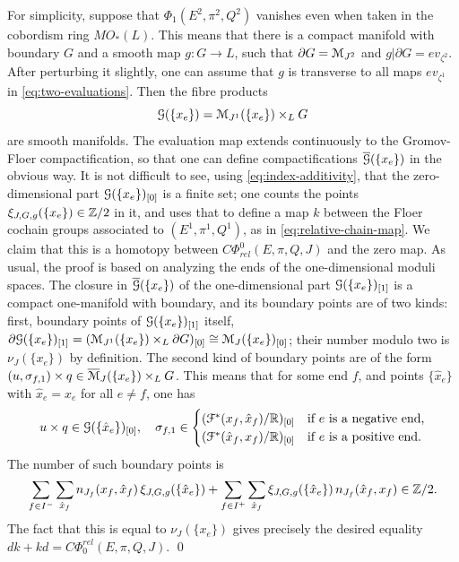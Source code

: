 \documentclass[10pt,letterpaper]{article}
\begin{document}
\proof For simplicity, suppose that $\Phi_1(E^2,\pi^2,Q^2)$ vanishes even when
taken in the cobordism ring $MO_*(L)$. This means that there is a compact
manifold with boundary $G$ and a smooth map $g: G \rightarrow L$, such that
$\partial G = \mathcal{M}_{J^2}$ and $g|\partial G = ev_{\zeta^2}$. After perturbing it
slightly, one can assume that $g$ is transverse to all maps $ev_{\zeta^1}$ in
\eqref{eq:two-evaluations}. Then the fibre products
\begin{equation} \label{eq:fibre-product}
\mathcal{G}(\{x_e\}) = \mathcal{M}_{J^1}(\{x_e\}) \times_L G
\end{equation}
are smooth manifolds. The evaluation map extends continuously to the
Gromov-Floer compactification, so that one can define compactifications
$\overline{\mathcal{G}}(\{x_e\})$ in the obvious way. It is not difficult to see, using
\eqref{eq:index-additivity}, that the zero-dimensional part
$\mathcal{G}(\{x_e\})_{[0]}$ is a finite set; one counts the points
$\xi_{J,G,g}(\{x_e\}) \in \mathbb{Z}/2$ in it, and uses that to define a map $k$
between the Floer cochain groups associated to $(E^1,\pi^1,Q^1)$, as in
\eqref{eq:relative-chain-map}. We claim that this is a homotopy between
$C\Phi^0_{rel}(E,\pi,Q,J)$ and the zero map. As usual, the proof is based on
analyzing the ends of the one-dimensional moduli spaces. The closure in
$\overline{\mathcal{G}}(\{x_e\})$ of the one-dimensional part $\mathcal{G}(\{x_e\})_{[1]}$ is a
compact one-manifold with boundary, and its boundary points are of two kinds:
first, boundary points of $\mathcal{G}(\{x_e\})_{[1]}$ itself,
$\partial\mathcal{G}(\{x_e\})_{[1]} = (\mathcal{M}_{J^1}(\{x_e\}) \times_L \partial G)_{[0]}
\cong \mathcal{M}_J(\{x_e\})_{[0]}$; their number modulo two is $\nu_J(\{x_e\})$ by
definition. The second kind of boundary points are of the form
$(u,\sigma_{f,1}) \times q \in \overline{\mathcal{M}}_J(\{x_e\}) \times_L G$. This
means that for some end $f$, and points $\{\hat{x}_e\}$ with $\hat{x}_e = x_e$
for all $e \neq f$, one has
\[
 u \times q \in \mathcal{G}(\{\hat{x}_e\})_{[0]}, \quad
 \sigma_{f,1} \in \begin{cases}
 (\mathcal{F}^*(x_f,\hat{x}_f)/\mathbb{R})_{[0]} & \text{if $e$ is a negative end,} \\
 (\mathcal{F}^*(\hat{x}_f,x_f)/\mathbb{R})_{[0]} & \text{if $e$ is a positive end.}
 \end{cases}
\]
The number of such boundary points is
\[
\sum_{f \in I^-} \sum_{\hat{x}_f}
  n_{J_f}(x_f,\hat{x}_f) \,
 \xi_{J,G,g}(\{\hat{x}_e\})
 +
\sum_{f \in I^+} \sum_{\hat{x}_f}
 \xi_{J,G,g}(\{\hat{x}_e\}) \,
 n_{J_f}(\hat{x}_f,x_f)
\in \mathbb{Z}/2.
\]
The fact that this is equal to $\nu_J(\{x_e\})$ gives precisely the desired
equality $dk + kd = C\Phi_0^{rel}(E,\pi,Q,J)$. \qed
\end{document}
